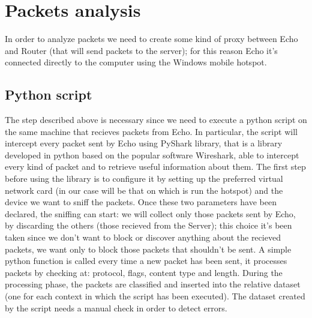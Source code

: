 \documentclass[sigconf]{acmart}
\begin{document}
    \section{Packets analysis}
    In order to analyze packets we need to create some kind of proxy between Echo and Router (that will send packets to the server); for this reason Echo it's connected directly to the computer using the Windows mobile hotspot.

    \subsection{Python script}
    The step described above is necessary since we need to execute a python script on the same machine that recieves packets from Echo. In particular, the script will intercept every packet sent by Echo using PyShark library, that is a library developed in python based on the popular software Wireshark, able to intercept every kind of packet and to retrieve useful information about them. The first step before using the library is to configure it by setting up the preferred virtual network card (in our case will be that on which is run the hotspot) and the device we want to sniff the packets. Once these two parameters have been declared, the sniffing can start: we will collect only those packets sent by Echo, by discarding the others (those recieved from the Server); this choice it's been taken since we don't want to block or discover anything about the recieved packets, we want only to block those packets that shouldn't be sent. A simple python function is called every time a new packet has been sent, it processes packets by checking at: protocol, flags, content type and length. During the processing phase, the packets are classified and inserted into the relative dataset (one for each context in which the script has been executed). The dataset created by the script needs a manual check in order to detect errors.
\end{document}

